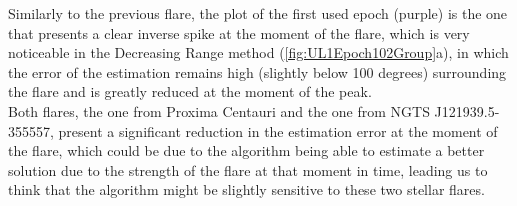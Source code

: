 Similarly to the previous flare, the plot of the first used epoch (purple) is the one that presents a clear inverse spike at the moment of the flare, which is very noticeable in the Decreasing Range method (\ref{fig:UL1Epoch102Group}a), in which the error of the estimation remains high (slightly below 100 degrees) surrounding the flare and is greatly reduced at the moment of the peak.\\

Both flares, the one from Proxima Centauri and the one from NGTS J121939.5-355557, present a significant reduction in the estimation error at the moment of the flare, which could be due to the algorithm being able to estimate a better solution due to the strength of the flare at that moment in time, leading us to think that the algorithm might be slightly sensitive to these two stellar flares.



















